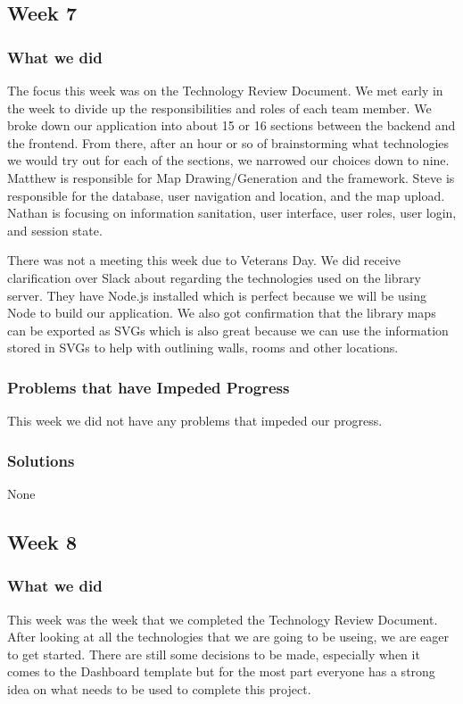 \documentclass[letterpaper,10pt,titlepage, onecolumn, compsoc]{IEEEtran}
\begin{document}
\subsection{Week 7}

\subsubsection{What we did}
The focus this week was on the Technology Review Document. We met early in the week to divide up the responsibilities and roles of each team member. We broke down our application into about 15 or 16 sections between the backend and the frontend. From there, after an hour or so of brainstorming what technologies we would try out for each of the sections, we narrowed our choices down to nine. Matthew is responsible for Map Drawing/Generation and the framework. Steve is responsible for the database, user navigation and location, and the map upload. Nathan is focusing on information sanitation, user interface, user roles, user login, and session state. 

There was not a meeting this week due to Veterans Day. We did receive clarification over Slack about regarding the technologies used on the library server. They have Node.js installed which is perfect because we will be using Node to build our application. We also got confirmation that the library maps can be exported as SVGs which is also great because we can use the information stored in SVGs to help with outlining walls, rooms and other locations. 

\subsubsection{Problems that have Impeded Progress}
This week we did not have any problems that impeded our progress.

\subsubsection{Solutions}
None

\subsection{Week 8}

\subsubsection{What we did}
This week was the week that we completed the Technology Review Document. After looking at all the technologies that we are going to be useing, we are eager to get started. There are still some decisions to be made, especially when it comes to the Dashboard template but for the most part everyone has a strong idea on what needs to be used to complete this project.
\end{document}
